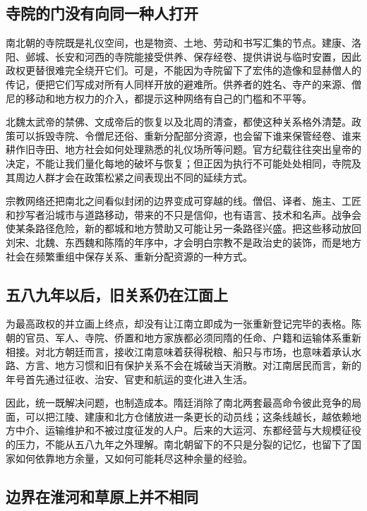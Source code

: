 \subsection{寺院的门没有向同一种人打开}

南北朝的寺院既是礼仪空间，也是物资、土地、劳动和书写汇集的节点。建康、洛阳、邺城、长安和河西的寺院能接受供养、保存经卷、提供讲说与临时安置，因此政权更替很难完全绕开它们。可是，不能因为寺院留下了宏伟的造像和显赫僧人的传记，便把它们写成对所有人同样开放的避难所。供养者的姓名、寺产的来源、僧尼的移动和地方权力的介入，都提示这种网络有自己的门槛和不平等。

北魏太武帝的禁佛、文成帝后的恢复以及北周的清查，都使这种关系格外清楚。政策可以拆毁寺院、令僧尼还俗、重新分配部分资源，也会留下谁来保管经卷、谁来耕作旧寺田、地方社会如何处理熟悉的礼仪场所等问题。官方纪载往往突出皇帝的决定，不能让我们量化每地的破坏与恢复；但正因为执行不可能处处相同，寺院及其周边人群才会在政策松紧之间表现出不同的延续方式。

宗教网络还把南北之间看似封闭的边界变成可穿越的线。僧侣、译者、施主、工匠和抄写者沿城市与道路移动，带来的不只是信仰，也有语言、技术和名声。战争会使某条路径危险，新的都城和地方赞助又可能让另一条路径兴盛。把这些移动放回刘宋、北魏、东西魏和陈隋的年序中，才会明白宗教不是政治史的装饰，而是地方社会在频繁重组中保存关系、重新分配资源的一种方式。

\subsection{五八九年以后，旧关系仍在江面上}

为最高政权的并立画上终点，却没有让江南立即成为一张重新登记完毕的表格。陈朝的官员、军人、寺院、侨置和地方家族都必须同隋的任命、户籍和运输体系重新相接。对北方朝廷而言，接收江南意味着获得税粮、船只与市场，也意味着承认水路、方言、地方习惯和旧有保护关系不会在城破当天消散。对江南居民而言，新的年号首先通过征收、治安、官吏和航运的变化进入生活。

因此，统一既解决问题，也制造成本。隋廷消除了南北两套最高命令彼此竞争的局面，可以把江陵、建康和北方仓储放进一条更长的动员线；这条线越长，越依赖地方中介、运输维护和不被过度征发的人户。后来的大运河、东都经营与大规模征役的压力，不能从五八九年之外理解。南北朝留下的不只是分裂的记忆，也留下了国家如何依靠地方余量，又如何可能耗尽这种余量的经验。

\subsection{边界在淮河和草原上并不相同}

